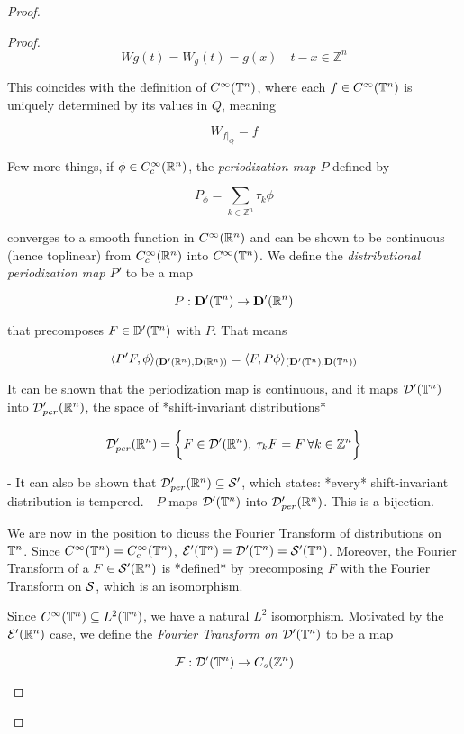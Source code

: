 \documentclass[../main-manifolds.tex]{subfiles}
\begin{document}
{{\begin{proof}
{{\begin{proof}
$$
Wg(t) = W_g(t) = g(x)\quad t-x\in\mathbb{Z}^n
$$

This coincides with the definition of $C^\infty({\mathbb{T}^n})$, where each $f\in C^\infty({\mathbb{T}^n})$ is uniquely determined by its values in $Q$, meaning

$$
W_{f\vert_{Q}} = f
$$

Few more things, if $\phi\in C_c^\infty({\mathbb{R}^n})$, the \emph{periodization map $P$} defined by

$$
P_\phi = \sum_{k\in\mathbb{Z}^n}\tau_k\phi
$$

converges to a smooth function in $C^\infty({\mathbb{R}^n})$ and can be shown to be continuous (hence toplinear) from $C_c^\infty({\mathbb{R}^n})$ into $C^\infty({\mathbb{T}^n})$. We define the \emph{distributional periodization map $P'$} to be a map

$$
P: \mathbf{D}'({\mathbb{T}^n})\to \mathbf{D}'({\mathbb{R}^n})
$$

that precomposes $F\in \mathbb{D}'({\mathbb{T}^n})$ with $P$. That means

$$
\langle P'F,\phi \rangle_{(\mathbf{D}'({\mathbb{R}^n}), \mathbf{D}({\mathbb{R}^n}))} = \langle F, P\phi\rangle_{(\mathbf{D}'({\mathbb{T}^n}), \mathbf{D}({\mathbb{T}^n}))}
$$

It can be shown that the periodization map is continuous, and it maps $\mathcal{D}'({\mathbb{T}^n})$ into $\mathcal{D}'_{per}({\mathbb{R}^n})$, the space of *shift-invariant distributions*

$$
\mathcal{D}'_{per}({\mathbb{R}^n}) = \biggl\{{F\in\mathcal{D}'({\mathbb{R}^n}),\: \tau_kF = F\: \forall k\in\mathbb{Z}^n}\biggr\}
$$

- It can also be shown that $\mathcal{D}'_{per}({\mathbb{R}^n})\subseteq\mathcal{S}'$, which states: *every* shift-invariant distribution is tempered.
- $P$ maps $\mathcal{D}'({\mathbb{T}^n})$ into $\mathcal{D}'_{per}({\mathbb{R}^n})$. This is a bijection.

We are now in the position to dicuss the Fourier Transform of distributions on ${\mathbb{T}^n}$. Since $C^\infty({\mathbb{T}^n}) = C_c^\infty({\mathbb{T}^n})$, $\mathcal{E}'({\mathbb{T}^n}) = \mathcal{D}'({\mathbb{T}^n}) = \mathcal{S}'({\mathbb{T}^n})$. Moreover, the Fourier Transform of a $F\in\mathcal{S}'({\mathbb{R}^n})$ is *defined* by precomposing $F$ with the Fourier Transform on $\mathcal{S}$, which is an isomorphism.

\begin{definition}
Since $C^\infty({\mathbb{T}^n})\subseteq L^2({\mathbb{T}^n})$, we have a natural $L^2$ isomorphism. Motivated by the $\mathcal{E}'({\mathbb{R}^n})$ case, we define the \emph{Fourier Transform on $\mathcal{D}'({\mathbb{T}^n})$} to be a map

$$
\mathcal{F}: \mathcal{D}'({\mathbb{T}^n})\to C_s(\mathbb{Z}^n)
$$


\end{definition}
\end{proof}}}
\end{proof}}}
\end{document}
